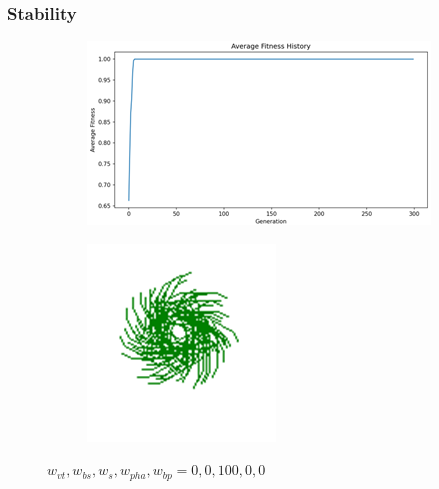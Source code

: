 \subsubsection{Stability}
\begin{figure}[H]
    \centering
    \begin{subfigure}[b]{0.3\textwidth}
        \includegraphics[width=\textwidth]{s_only.png}
    \end{subfigure}
    \begin{subfigure}[b]{0.1\textwidth}
        \includegraphics[width=\textwidth]{s_only_dr.png}
    \end{subfigure}

    \vspace{0.5cm}
    \caption{$w_{vt}, w_{bs}, w_{s}, w_{pha}, w_{bp} = 0, 0, 100, 0, 0$}
    \label{fig:subfigures}
\end{figure}

